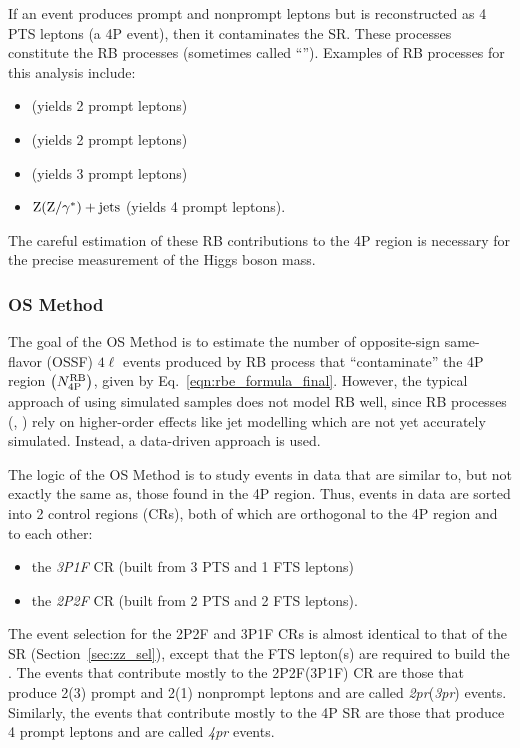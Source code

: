If an event produces prompt and nonprompt leptons but is reconstructed as 4 PTS leptons (a 4P event), then it contaminates the SR.
These processes constitute the RB processes (sometimes called ``\ZplusX'').
Examples of RB processes for this analysis include:
\begin{itemize}
	\item \Zplusjets (yields 2 prompt leptons)
	\item \ttbarplusjets (yields 2 prompt leptons)
	\item \WZplusjets (yields 3 prompt leptons)
	\item $\mathrm{Z}(\mathrm{Z}/\gamma^\ast) + \text{jets}$ (yields 4 prompt leptons).
\end{itemize}
The careful estimation of these RB contributions to the 4P region is necessary for the precise measurement of the Higgs boson mass.

\subsubsection{OS Method}
The goal of the OS Method is to estimate the number of opposite-sign same-flavor (OSSF) $4\ell$ events produced by RB process that ``contaminate'' the 4P region $\left( N_\text{4P}^\text{RB} \right)$, given by Eq.~\ref{eqn:rbe_formula_final}.
However, the typical approach of using simulated samples does not model RB well, since RB processes (\eg, \Zplusjets) rely on higher-order effects like jet modelling which are not yet accurately simulated.
Instead, a data-driven approach is used.

The logic of the OS Method is to study events in data that are similar to, but not exactly the same as, those found in the 4P region.
Thus, events in data are sorted into 2 control regions (CRs), both of which are orthogonal to the 4P region and to each other:
\begin{itemize}
	\item the \emph{3P1F} CR (built from 3 PTS and 1 FTS leptons)
	\item the \emph{2P2F} CR (built from 2 PTS and 2 FTS leptons).
\end{itemize}
The event selection for the 2P2F and 3P1F CRs is almost identical to that of the SR (Section~\ref{sec:zz_sel}),
except that the FTS lepton(s) are required to build the \Ztwo.
The events that contribute mostly to the 2P2F(3P1F) CR are those that produce 2(3) prompt and 2(1) nonprompt leptons and are called \emph{2pr}(\emph{3pr}) events.
Similarly, the events that contribute mostly to the 4P SR are those that produce 4 prompt leptons and are called \emph{4pr} events.

